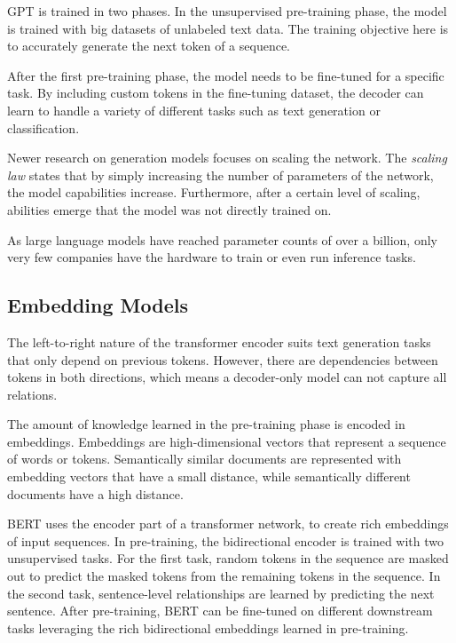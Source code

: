 \documentclass[../main.tex]{subfiles}
\begin{document}
GPT is trained in two phases.
In the unsupervised pre-training phase,
the model is trained with big datasets of unlabeled text data.
The training objective here is
to accurately generate the next token of a sequence.

After the first pre-training phase,
the model needs to be fine-tuned for a specific task.
By including custom tokens in the fine-tuning dataset,
the decoder can learn to handle a variety of different tasks
such as text generation or classification.

Newer research on generation models focuses on scaling the network.
The \emph{scaling law} states
that by simply increasing the number of parameters of the network,
the model capabilities increase.
Furthermore,
after a certain level of scaling,
abilities emerge that the model was not directly trained on.

As large language models have reached parameter counts of over a billion,
only very few companies have the hardware to train or even run inference tasks.

\subsection{Embedding Models}
\label{subsec:embedding}

The left-to-right nature of the transformer encoder suits text generation tasks that only depend on previous tokens.
However, there are dependencies between tokens in both directions,
which means a decoder-only model can not capture all relations.

The amount of knowledge learned in the pre-training phase is encoded in embeddings.
Embeddings are high-dimensional vectors that represent a sequence of words or tokens.
Semantically similar documents are represented with embedding vectors that have a small distance,
while semantically different documents have a high distance.

BERT \cite{Devlin2019} uses the encoder part of a transformer network, to create rich embeddings of input sequences.
In pre-training, the bidirectional encoder is trained with two unsupervised tasks.
For the first task,
random tokens in the sequence are masked out to predict the masked tokens from the remaining tokens in the sequence.
In the second task, sentence-level relationships are learned by predicting the next sentence.
After pre-training, BERT can be fine-tuned on different downstream tasks
leveraging the rich bidirectional embeddings learned in pre-training.
\end{document}
